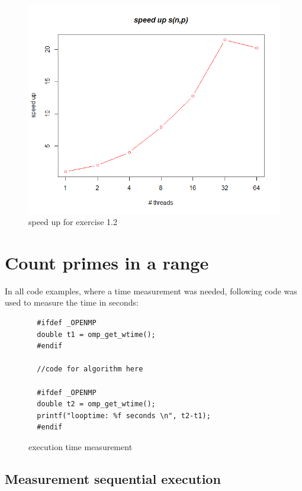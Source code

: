\documentclass[11pt,a4paper]{article}
\begin{document}
\begin{figure}[h]
\centering
  \includegraphics[scale=0.35]{statistics/Ex12SpeedUpGraph.png}
	\caption{speed up for exercise 1.2}
	\label{ex12speedUp}
\end{figure}

\pagebreak

\section{Count primes in a range}

In all code examples, where a time measurement was needed, following code was used to measure the time in seconds:
 
\begin{figure}[h]
\label{code_timemeasurement}
\begin{lstlisting}
  #ifdef _OPENMP
  double t1 = omp_get_wtime();
  #endif  
  
  //code for algorithm here
  
  #ifdef _OPENMP
  double t2 = omp_get_wtime();
  printf("looptime: %f seconds \n", t2-t1);
  #endif
\end{lstlisting} 
\caption{execution time measurement}
\end{figure} 
 

\subsection{Measurement sequential execution}
\end{document}
